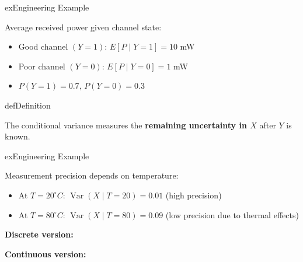 \begin{PSbox}[unbreakable]{ex}{Engineering Example}

Average received power given channel state:

\begin{itemize}
\tightlist
\item
  Good channel $(Y = 1)$: $E[P \mid Y = 1] = 10$ mW
\item
  Poor channel $(Y = 0)$: $E[P \mid Y = 0] = 1$ mW
\item
  $P(Y = 1) = 0.7,\, P(Y = 0) = 0.3$
\end{itemize}

\end{PSbox}


\begin{PSbox}[unbreakable]{def}{Definition}


\end{PSbox}


The conditional variance measures the \textbf{remaining uncertainty in $X$} after $Y$ is known.

\begin{PSbox}[unbreakable]{ex}{Engineering Example}

Measurement precision depends on temperature:

\begin{itemize}
\tightlist
\item
  At $T = 20^{\circ}C$: $\operatorname{Var}(X \mid T = 20) = 0.01$ (high precision)
\item
  At $T = 80^{\circ}C$: $\operatorname{Var}(X \mid T = 80) = 0.09$ (low precision due to thermal effects)
\end{itemize}

\end{PSbox}




\textbf{Discrete version:}

\textbf{Continuous version:}

